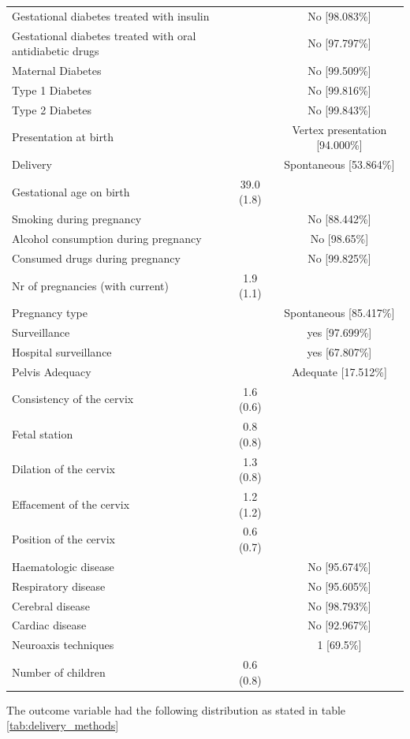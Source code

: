 \begin{table}[htbp]
\begin{tabular}{m{15em}cc}
        Gestational diabetes treated with insulin & ~ & No [98.083\%] \\ 
        Gestational diabetes treated with oral antidiabetic drugs & ~ & No [97.797\%] \\ 
        Maternal Diabetes & ~ & No [99.509\%] \\ 
        Type 1 Diabetes & ~ & No [99.816\%] \\ 
        Type 2 Diabetes & ~ & No [99.843\%] \\ 
        Presentation at birth & ~ & Vertex presentation [94.000\%] \\ 
        Delivery & ~ & Spontaneous [53.864\%] \\ 
        Gestational age on birth & 39.0 (1.8) & ~ \\ 
        Smoking during pregnancy & ~ & No [88.442\%] \\ 
        Alcohol consumption during pregnancy & ~ & No [98.65\%] \\ 
        Consumed drugs during pregnancy & ~ & No [99.825\%] \\ 
        Nr of pregnancies (with current) & 1.9 (1.1) & ~ \\ 
        Pregnancy type & ~ & Spontaneous [85.417\%] \\ 
        Surveillance & ~ & yes [97.699\%] \\ 
        Hospital surveillance & ~ & yes [67.807\%] \\ 
        Pelvis Adequacy & ~ & Adequate [17.512\%] \\ 
        Consistency of the cervix & 1.6 (0.6) & ~ \\ 
        Fetal station & 0.8 (0.8) & ~ \\ 
        Dilation of the cervix & 1.3 (0.8) & ~ \\ 
        Effacement of the cervix & 1.2 (1.2) & ~ \\ 
        Position of the cervix & 0.6 (0.7) & ~ \\ 
        Haematologic disease & ~ & No [95.674\%] \\ 
        Respiratory disease & ~ & No [95.605\%] \\ 
        Cerebral disease & ~ & No [98.793\%] \\ 
        Cardiac disease & ~ & No [92.967\%] \\ 
        Neuroaxis techniques & ~ & 1 [69.5\%] \\ 
        Number of children  & 0.6 (0.8)  & ~\\ 
        \bottomrule
    \end{tabular}


\end{table}
The outcome variable had the following distribution as stated in table \ref{tab:delivery_methods}

